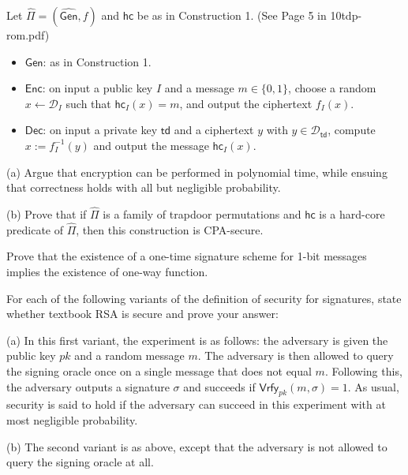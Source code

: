 \documentclass[12pt,letterpaper,boxed]{amspset}
\begin{document}
\begin{problem}[10.7]
Let $\widehat{\Pi} = (\widehat{\mathsf{Gen}},f)$ and $\mathsf{hc}$ be as in Construction 1. (See Page 5 in 10tdp-rom.pdf)
\begin{itemize}
\item $\mathsf{Gen}$: as in Construction 1.
\item $\mathsf{Enc}$: on input a public key $I$ and a message $m \in \{0,1\}$, choose a random $x \gets \mathcal{D}_I$ such that $\mathsf{hc}_I(x) = m$, and output the ciphertext $f_I(x)$.
\item $\mathsf{Dec}$: on input a private key $\mathsf{td}$ and a ciphertext $y$ with $y \in \mathcal{D}_{\mathsf{td}}$, compute $x:=f_I^{-1}(y)$ and output the message $\mathsf{hc}_I(x)$.
\end{itemize}
\end{problem}

\begin{solution}
(a) Argue that encryption can be performed in polynomial time, while ensuing that correctness holds with all but negligible probability.
\vspace{5cm}

\noindent (b) Prove that if $\widehat{\Pi}$ is a family of trapdoor permutations and $\mathsf{hc}$ is a hard-core predicate of $\widehat{\Pi}$, then this construction is CPA-secure.
\vspace{10cm}

\end{solution}

\begin{problem}[12.1]
Prove that the existence of a one-time signature scheme for 1-bit messages implies the existence of one-way function.
\end{problem}

\begin{solution}
\vspace{6cm}
\end{solution}

\begin{problem}[12.2]
For each of the following variants of the definition of security for signatures, state whether textbook RSA is secure and prove your answer: 
\end{problem}

\begin{solution}
(a) In this first variant, the experiment is as follows: the adversary is given the public key $pk$ and a random message $m$. The adversary is then allowed to query the signing oracle once on a single message that does not equal $m$. Following this, the adversary outputs a signature $\sigma$ and succeeds if $\mathsf{Vrfy}_{pk}(m,\sigma)=1$. As usual, security is said to hold if the adversary can succeed in this experiment with at most negligible probability.	
\vspace{5cm}

\noindent (b) The second variant is as above, except that the adversary is not allowed to query the signing oracle at all.
\vspace{4cm}

\end{solution}
\end{document}
